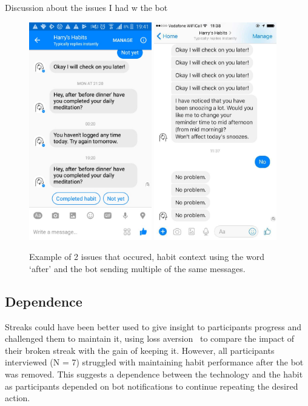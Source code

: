 Discussion about the issues I had w the bot
\begin{figure}[H]
  \centering
  \includegraphics[width=2.1in]{../resources/feedback/after-before.jpg}
  \hspace{10px}
  \includegraphics[width=2.1in]{../resources/feedback/double-messages.jpg}
  \caption{Example of 2 issues that occured, habit context using the word `after' and the bot sending multiple of the same messages.}
  \label{fig:study_bot_issues}
\end{figure}



\subsection*{Dependence}
Streaks could have been better used to give insight to participants progress and challenged them to maintain it, using loss aversion~\cite{loss_aversion} to compare the impact of their broken streak with the gain of keeping it. However, all participants interviewed (N = 7) struggled with maintaining habit performance after the bot was removed. This suggests a dependence between the technology and the habit as participants depended on bot notifications to continue repeating the desired action.


